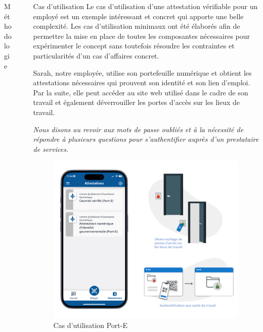 \documentclass[final]{beamer}
\newlength{\sepwid}
\newlength{\onecolwid}
\newlength{\twocolwid}
\begin{document}
\begin{frame}[t]
\begin{columns}[t]
\begin{column}{\onecolwid}
\begin{block}{Méthodologie}
\end{block}

\end{column} %


\begin{column}{\sepwid}\end{column} %

\begin{column}{\twocolwid} %


\begin{alertblock}{Cas d'utilisation}
Le cas d'utilisation d'une attestation vérifiable pour un employé est un exemple intéressant et concret qui apporte une belle complexité. Les cas d'utilisation minimaux ont été élaborés afin de permettre la mise en place de toutes les composantes nécessaires pour expérimenter le concept sans toutefois résoudre les contraintes et particularités d'un cas d'affaires concret.

Sarah, notre employée, utilise son portefeuille numérique et obtient les attestations nécessaires qui prouvent son identité et son lien d'emploi. Par la suite, elle peut accéder au site web utilisé dans le cadre de son travail et également déverrouiller les portes d’accès sur les lieux de travail. 

\textit{Nous disons au revoir aux mots de passe oubliés et à la nécessité de répondre à plusieurs questions pour s’authentifier auprès d’un prestataire de services.}

\begin{figure}
\includegraphics[width=0.5\linewidth]{Port-E-Usecase.png}
\caption{ Cas d'utilisation Port-E}
\end{figure}


\end{alertblock}
\end{column}
\end{columns}
\end{frame}
\end{document}
